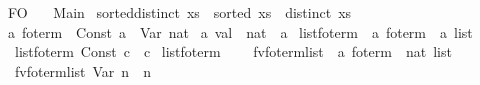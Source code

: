 %
\begin{isabellebody}%
%
%
\isadelimtheory
%
\endisadelimtheory
%
\isatagtheory
{}\isamarkupfalse%
\ FO\isanewline
\ \ \ Main\isanewline
{}%
\endisatagtheory
{\isafoldtheory}%
%
\isadelimtheory
\isanewline
%
\endisadelimtheory
\isanewline
{}\isamarkupfalse%
\ {\isachardoublequoteopen}sorted{\isacharunderscore}{\kern0pt}distinct\ xs\ {\isasymequiv}\ sorted\ xs\ {\isasymand}\ distinct\ xs{\isachardoublequoteclose}\isanewline
\isanewline
{}\isamarkupfalse%
\ {\isacharprime}{\kern0pt}a\ fo{\isacharunderscore}{\kern0pt}term\ {\isacharequal}{\kern0pt}\ Const\ {\isacharprime}{\kern0pt}a\ {\isacharbar}{\kern0pt}\ Var\ nat\isanewline
\isanewline
{}\isamarkupfalse%
\ {\isacharprime}{\kern0pt}a\ val\ {\isacharequal}{\kern0pt}\ {\isachardoublequoteopen}nat\ {\isasymRightarrow}\ {\isacharprime}{\kern0pt}a{\isachardoublequoteclose}\isanewline
\isanewline
{}\isamarkupfalse%
\ list{\isacharunderscore}{\kern0pt}fo{\isacharunderscore}{\kern0pt}term\ {\isacharcolon}{\kern0pt}{\isacharcolon}{\kern0pt}\ {\isachardoublequoteopen}{\isacharprime}{\kern0pt}a\ fo{\isacharunderscore}{\kern0pt}term\ {\isasymRightarrow}\ {\isacharprime}{\kern0pt}a\ list{\isachardoublequoteclose}\ \isanewline
\ \ {\isachardoublequoteopen}list{\isacharunderscore}{\kern0pt}fo{\isacharunderscore}{\kern0pt}term\ {\isacharparenleft}{\kern0pt}Const\ c{\isacharparenright}{\kern0pt}\ {\isacharequal}{\kern0pt}\ {\isacharbrackleft}{\kern0pt}c{\isacharbrackright}{\kern0pt}{\isachardoublequoteclose}\isanewline
{\isacharbar}{\kern0pt}\ {\isachardoublequoteopen}list{\isacharunderscore}{\kern0pt}fo{\isacharunderscore}{\kern0pt}term\ {\isacharunderscore}{\kern0pt}\ {\isacharequal}{\kern0pt}\ {\isacharbrackleft}{\kern0pt}{\isacharbrackright}{\kern0pt}{\isachardoublequoteclose}\isanewline
\isanewline
{}\isamarkupfalse%
\ fv{\isacharunderscore}{\kern0pt}fo{\isacharunderscore}{\kern0pt}term{\isacharunderscore}{\kern0pt}list\ {\isacharcolon}{\kern0pt}{\isacharcolon}{\kern0pt}\ {\isachardoublequoteopen}{\isacharprime}{\kern0pt}a\ fo{\isacharunderscore}{\kern0pt}term\ {\isasymRightarrow}\ nat\ list{\isachardoublequoteclose}\ \isanewline
\ \ {\isachardoublequoteopen}fv{\isacharunderscore}{\kern0pt}fo{\isacharunderscore}{\kern0pt}term{\isacharunderscore}{\kern0pt}list\ {\isacharparenleft}{\kern0pt}Var\ n{\isacharparenright}{\kern0pt}\ {\isacharequal}{\kern0pt}\ {\isacharbrackleft}{\kern0pt}n{\isacharbrackright}{\kern0pt}{\isachardoublequoteclose}\isanewline

\end{isabellebody}
